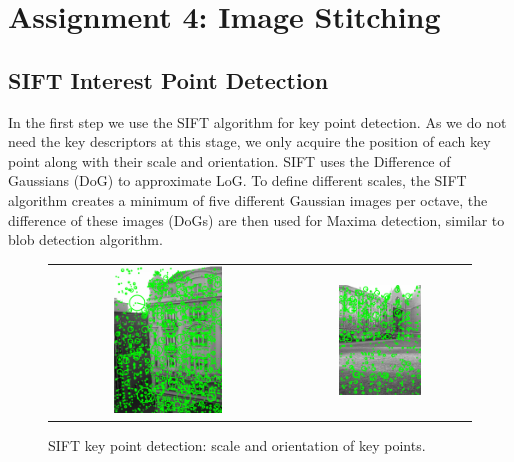 \section{Assignment 4: Image Stitching}
\label{sec:assignment4}


\subsection{SIFT Interest Point Detection}

In the first step we use the SIFT algorithm for key point detection. As we do not need the key descriptors at this stage, we only acquire the position of each key point along with their scale and orientation. SIFT uses the Difference of Gaussians (DoG) to approximate LoG. To define different scales, the SIFT algorithm creates a minimum of five different Gaussian images per octave, the difference of these images (DoGs) are then used for Maxima detection, similar to blob detection algorithm. 

\begin{figure}[h]
	\centering
	\begin{tabular}{cc}
	\includegraphics[width=0.48\textwidth]{figures/vl_plotframe_officeview1.png} &
	\includegraphics[width=0.48\textwidth]{figures/vl_plotframe_campus4.png} 

	\end{tabular}
	\caption{SIFT key point detection: scale and orientation of key points.}
	\label{fig:a4:vlplotframe}
\end{figure}

